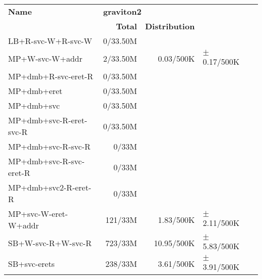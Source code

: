 \begin{tabular}{l  | r r l l}
   \textbf{Name}           & \multicolumn{3}{l}{\textbf{graviton2}}                       & \\
                           & \textbf{Total} & \textbf{Distribution} &                 & \\
        LB+R-svc-W+R-svc-W &       0/33.50M &                       &                 & \\ \hline 
           MP+W-svc-W+addr &       2/33.50M &             0.03/500K & $\pm$ 0.17/500K & \\ \hline 
       MP+dmb+R-svc-eret-R &       0/33.50M &                       &                 & \\ \hline 
               MP+dmb+eret &       0/33.50M &                       &                 & \\ \hline 
                MP+dmb+svc &       0/33.50M &                       &                 & \\ \hline 
   MP+dmb+svc-R-eret-svc-R &       0/33.50M &                       &                 & \\ \hline 
        MP+dmb+svc-R-svc-R &          0/33M &                       &                 & \\ \hline 
   MP+dmb+svc-R-svc-eret-R &          0/33M &                       &                 & \\ \hline 
      MP+dmb+svc2-R-eret-R &          0/33M &                       &                 & \\ \hline 
      MP+svc-W-eret-W+addr &        121/33M &             1.83/500K & $\pm$ 2.11/500K & \\ \hline 
        SB+W-svc-R+W-svc-R &        723/33M &            10.95/500K & $\pm$ 5.83/500K & \\ \hline 
              SB+svc-erets &        238/33M &             3.61/500K & $\pm$ 3.91/500K & \\ \hline 
\end{tabular}
